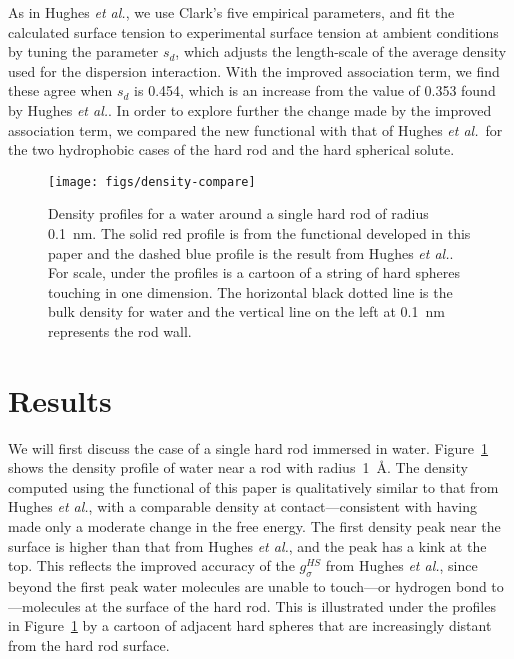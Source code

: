 \documentclass[preprint,amsmath,amssymb]{revtex4-1}
\newcommand\lscale{\ensuremath{s_d}}
\newcommand\hughesetal{Hughes \emph{et al.}}
\begin{document}
As in \hughesetal, we use Clark's five empirical parameters, and fit
the calculated surface tension to experimental surface tension at
ambient conditions by tuning the parameter $\lscale$, which adjusts
the length-scale of the average density used for the dispersion
interaction.  With the improved association term, we find these agree
when $\lscale$ is 0.454, which is an increase from the value of 0.353
found by \hughesetal.  In order to explore further the change made by
the improved association term, we compared the new functional with
that of \hughesetal\ for the two hydrophobic cases of the hard rod and
the hard spherical solute.

\begin{figure}
\begin{center}
\texttt{[image: figs/density-compare]}
\end{center}
\caption{ Density profiles for a water around a single hard rod
  of radius 0.1~nm. The solid red profile is from the functional
  developed in this paper and the dashed blue profile is the result
  from \hughesetal.  For scale, under the profiles
  is a cartoon of a string of hard spheres touching in one
  dimension. The horizontal black dotted line is the bulk density for
  water and the vertical line on the left at 0.1~nm represents the
  rod wall.}
\label{fig:density-single-rod}
\end{figure}

\section{Results}

We will first discuss the case of a single hard rod immersed in
water. Figure~\ref{fig:density-single-rod} shows the density profile
of water near a rod with radius~1~\AA.  The density computed using the
functional of this paper is qualitatively similar to that from
\hughesetal, with a comparable density at contact---consistent with
having made only a moderate change in the free energy.  The first
density peak near the surface is higher than that from \hughesetal,
and the peak has a kink at the top.  This reflects the improved
accuracy of the $g_\sigma^\textit{HS}$ from \hughesetal, since beyond
the first peak water molecules are unable to touch---or hydrogen bond
to---molecules at the surface of the hard rod. This is illustrated
under the profiles in Figure~\ref{fig:density-single-rod} by a cartoon
of adjacent hard spheres that are increasingly distant from the hard
rod surface.
\end{document}
